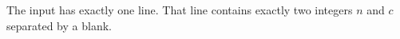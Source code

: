The input has exactly one line.
That line contains exactly two integers $n$ and $c$ separated by a blank.
